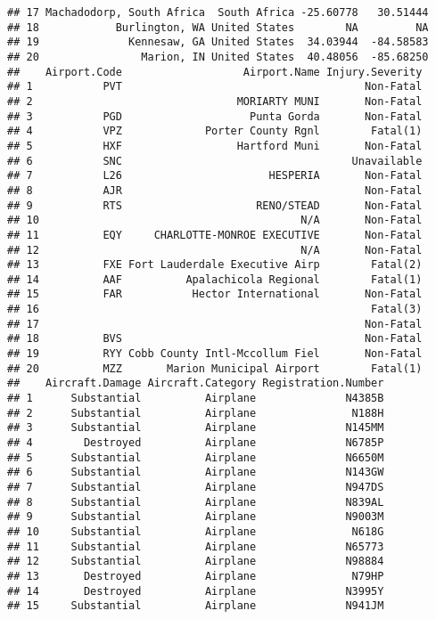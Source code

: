\documentclass[]{article}
\begin{document}
\begin{verbatim}
## 17 Machadodorp, South Africa  South Africa -25.60778   30.51444
## 18            Burlington, WA United States        NA         NA
## 19              Kennesaw, GA United States  34.03944  -84.58583
## 20                Marion, IN United States  40.48056  -85.68250
##    Airport.Code                   Airport.Name Injury.Severity
## 1           PVT                                      Non-Fatal
## 2                                MORIARTY MUNI       Non-Fatal
## 3           PGD                    Punta Gorda       Non-Fatal
## 4           VPZ             Porter County Rgnl        Fatal(1)
## 5           HXF                  Hartford Muni       Non-Fatal
## 6           SNC                                    Unavailable
## 7           L26                       HESPERIA       Non-Fatal
## 8           AJR                                      Non-Fatal
## 9           RTS                     RENO/STEAD       Non-Fatal
## 10                                         N/A       Non-Fatal
## 11          EQY     CHARLOTTE-MONROE EXECUTIVE       Non-Fatal
## 12                                         N/A       Non-Fatal
## 13          FXE Fort Lauderdale Executive Airp        Fatal(2)
## 14          AAF          Apalachicola Regional        Fatal(1)
## 15          FAR           Hector International       Non-Fatal
## 16                                                    Fatal(3)
## 17                                                   Non-Fatal
## 18          BVS                                      Non-Fatal
## 19          RYY Cobb County Intl-Mccollum Fiel       Non-Fatal
## 20          MZZ       Marion Municipal Airport        Fatal(1)
##    Aircraft.Damage Aircraft.Category Registration.Number
## 1      Substantial          Airplane              N4385B
## 2      Substantial          Airplane               N188H
## 3      Substantial          Airplane              N145MM
## 4        Destroyed          Airplane              N6785P
## 5      Substantial          Airplane              N6650M
## 6      Substantial          Airplane              N143GW
## 7      Substantial          Airplane              N947DS
## 8      Substantial          Airplane              N839AL
## 9      Substantial          Airplane              N9003M
## 10     Substantial          Airplane               N618G
## 11     Substantial          Airplane              N65773
## 12     Substantial          Airplane              N98884
## 13       Destroyed          Airplane               N79HP
## 14       Destroyed          Airplane              N3995Y
## 15     Substantial          Airplane              N941JM

\end{verbatim}
\end{document}
